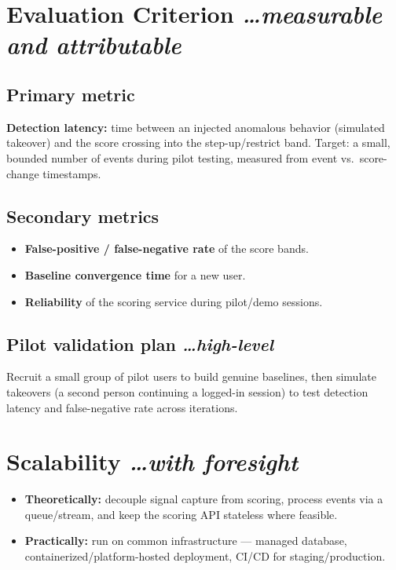 \documentclass[11pt,a4paper]{article}
\newcommand{\BvrHint}[1]{%
  {\normalfont\normalsize\itshape\hfill #1}}
\begin{document}
\section{Evaluation Criterion%
\BvrHint{\ldots measurable and attributable}} 
\subsection{Primary metric} 
\textbf{Detection latency:} time between an injected anomalous 
behavior (simulated takeover) and the score crossing into the 
step-up/restrict band. Target: a small, bounded number of 
events during pilot testing, measured from event vs.\ score-change 
timestamps. 
 
\subsection{Secondary metrics} 
\begin{itemize}[leftmargin=0.7cm] 
    \item \textbf{False-positive / false-negative rate} of the score bands. 
    \item \textbf{Baseline convergence time} for a new user. 
    \item \textbf{Reliability} of the scoring service during pilot/demo sessions. 
\end{itemize} 
 
\subsection{Pilot validation plan%
\BvrHint{\ldots high-level}} 
Recruit a small group of pilot users to build genuine baselines, then 
simulate takeovers (a second person continuing a logged-in session) 
to test detection latency and false-negative rate across iterations. 
 
\section{Scalability%
\BvrHint{\ldots with foresight}} 
\begin{itemize}[leftmargin=0.7cm] 
    \item \textbf{Theoretically:} decouple signal capture from scoring, process events via a queue/stream, and keep the scoring API stateless where feasible. 
    \item \textbf{Practically:} run on common infrastructure --- managed database, containerized/platform-hosted deployment, CI/CD for staging/production. 
\end{itemize} 
 
\end{document}
